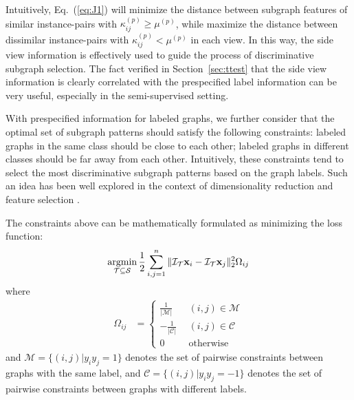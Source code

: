 \documentclass[conference]{IEEEtran}
\begin{document}
Intuitively, Eq.~(\ref{eq:J1}) will minimize the distance between subgraph features of similar instance-pairs with $\kappa^{(p)}_{ij}\ge\mu^{(p)}$, while maximize the distance between dissimilar instance-pairs with $\kappa^{(p)}_{ij}<\mu^{(p)}$ in each view. In this way, the side view information is effectively used to guide the process of discriminative subgraph selection. The fact verified in Section~\ref{sec:ttest} that the side view information is clearly correlated with the prespecified label information can be very useful, especially in the semi-supervised setting.

With prespecified information for labeled graphs, we further consider that the optimal set of subgraph patterns should satisfy the following constraints: labeled graphs in the same class should be close to each other; labeled graphs in different classes should be far away from each other. Intuitively, these constraints tend to select the most discriminative subgraph patterns based on the graph labels. Such an idea has been well explored in the context of dimensionality reduction and feature selection \cite{bar2005learning,tang2006pairwise}.%

The constraints above can be mathematically formulated as minimizing the loss function:
\begin{equation}
\operatornamewithlimits{argmin}_{\mathcal{T}\subseteq\mathcal{S}}\frac{1}{2}\sum_{i,j=1}^n\|\mathcal{I}_\mathcal{T}\mathbf{x}_i-\mathcal{I}_\mathcal{T}\mathbf{x}_j\|^2_2\Omega_{ij}
\label{eq:J2}
\end{equation}
where
\begin{align}\label{eq:omega}
\Omega_{ij}
&=\left\{
\begin{array}{ll}
    \frac{1}{|\mathcal{M}|}~&~(i,j)\in\mathcal{M}\\
    -\frac{1}{|\mathcal{C}|}~&~(i,j)\in\mathcal{C}\\
    0~&~\text{otherwise}
\end{array}
\right.
\end{align}
and $\mathcal{M}=\{(i,j)|y_i y_j=1\}$ denotes the set of pairwise constraints between graphs with the same label, and $\mathcal{C}=\{(i,j)|y_i y_j=-1\}$ denotes the set of pairwise constraints between graphs with different labels.
\end{document}
